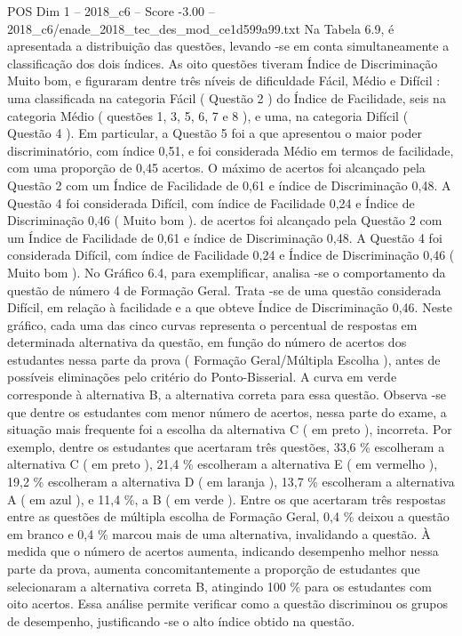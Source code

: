 \begin{textsample}{POS Dim 1 – 2018\_c6 – Score -3.00 – 2018\_c6/enade\_2018\_tec\_des\_mod\_ce1d599a99.txt}
Na Tabela 6.9, é apresentada a distribuição das questões, levando -se em conta simultaneamente a classificação dos dois índices.
As oito questões tiveram Índice de Discriminação Muito bom, e figuraram dentre três níveis de dificuldade Fácil, Médio e Difícil : uma classificada na categoria Fácil ( Questão 2 ) do Índice de Facilidade, seis na categoria Médio ( questões 1, 3, 5, 6, 7 e 8 ), e uma, na categoria Difícil ( Questão 4 ).
Em particular, a Questão 5 foi a que apresentou o maior poder discriminatório, com índice 0,51, e foi considerada Médio em termos de facilidade, com uma proporção de 0,45 acertos.
O máximo de acertos foi alcançado pela Questão 2 com um Índice de Facilidade de 0,61 e índice de Discriminação 0,48.
A Questão 4 foi considerada Difícil, com índice de Facilidade 0,24 e Índice de Discriminação 0,46 ( Muito bom ). de acertos foi alcançado pela Questão 2 com um Índice de Facilidade de 0,61 e índice de Discriminação 0,48.
A Questão 4 foi considerada Difícil, com índice de Facilidade 0,24 e Índice de Discriminação 0,46 ( Muito bom ).
No Gráfico 6.4, para exemplificar, analisa -se o comportamento da questão de número 4 de Formação Geral.
Trata -se de uma questão considerada Difícil, em relação à facilidade e a que obteve Índice de Discriminação 0,46.
Neste gráfico, cada uma das cinco curvas representa o percentual de respostas em determinada alternativa da questão, em função do número de acertos dos estudantes nessa parte da prova ( Formação Geral/Múltipla Escolha ), antes de possíveis eliminações pelo critério do Ponto-Bisserial.
A curva em verde corresponde à alternativa B, a alternativa correta para essa questão.
Observa -se que dentre os estudantes com menor número de acertos, nessa parte do exame, a situação mais frequente foi a escolha da alternativa C ( em preto ), incorreta.
Por exemplo, dentre os estudantes que acertaram três questões, 33,6 \% escolheram a alternativa C ( em preto ), 21,4 \% escolheram a alternativa E ( em vermelho ), 19,2 \% escolheram a alternativa D ( em laranja ), 13,7 \% escolheram a alternativa A ( em azul ), e 11,4 \%, a B ( em verde ).
Entre os que acertaram três respostas entre as questões de múltipla escolha de Formação Geral, 0,4 \% deixou a questão em branco e 0,4 \% marcou mais de uma alternativa, invalidando a questão.
À medida que o número de acertos aumenta, indicando desempenho melhor nessa parte da prova, aumenta concomitantemente a proporção de estudantes que selecionaram a alternativa correta B, atingindo 100 \% para os estudantes com oito acertos.
Essa análise permite verificar como a questão discriminou os grupos de desempenho, justificando -se o alto índice obtido na questão.

\end{textsample}
